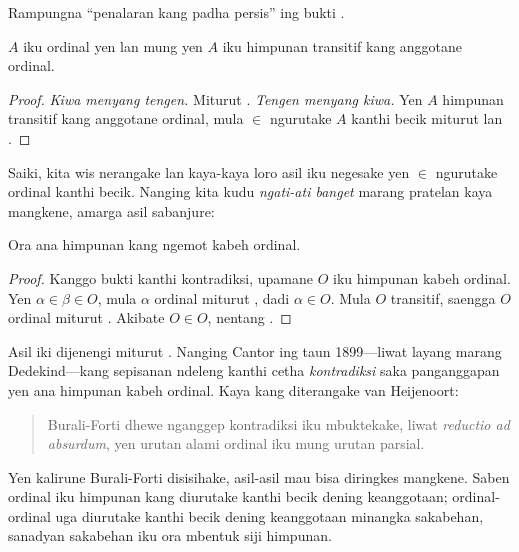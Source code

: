 \documentclass[../../../include/open-logic-section]{subfiles}
\begin{document}
\begin{prob}
Rampungna ``penalaran kang padha persis'' ing bukti
.
\end{prob}

\begin{cor}
$A$ iku ordinal yen lan mung yen $A$ iku himpunan
transitif kang anggotane ordinal.
\end{cor}

\begin{proof}
\emph{Kiwa menyang tengen.} Miturut
. \emph{Tengen menyang kiwa.}
Yen $A$ himpunan transitif kang anggotane ordinal,
mula $\in$ ngurutake $A$ kanthi becik miturut
 lan .
\end{proof}

Saiki, kita wis nerangake
 lan 
kaya-kaya loro asil iku negesake yen $\in$ ngurutake
ordinal kanthi becik. Nanging kita kudu
\emph{ngati-ati banget} marang pratelan kaya mangkene,
amarga asil sabanjure:

\begin{thm}
Ora ana himpunan kang ngemot kabeh ordinal.
\end{thm}

\begin{proof}
Kanggo bukti kanthi kontradiksi, upamane $O$ iku
himpunan kabeh ordinal. Yen $\alpha \in \beta \in O$,
mula $\alpha$ ordinal miturut ,
dadi $\alpha \in O$. Mula $O$ transitif, saengga
$O$ ordinal miturut .
Akibate $O \in O$, nentang .
\end{proof}
\noindent
Asil iki dijenengi miturut \citeauthor{Burali-Forti1897}.
Nanging Cantor ing taun 1899---liwat layang marang
Dedekind---kang sepisanan ndeleng kanthi cetha
\emph{kontradiksi} saka panganggapan yen ana himpunan
kabeh ordinal. Kaya kang diterangake van Heijenoort:
\begin{quote}
  Burali-Forti dhewe nganggep kontradiksi iku mbuktekake,
  liwat \emph{reductio ad absurdum}, yen urutan alami
  ordinal iku mung urutan parsial.
  \citep[p.~105]{Heijenoort1967}
\end{quote}
Yen kalirune Burali-Forti disisihake, asil-asil mau
bisa diringkes mangkene. Saben ordinal iku himpunan
kang diurutake kanthi becik dening keanggotaan;
ordinal-ordinal uga diurutake kanthi becik dening
keanggotaan minangka sakabehan, sanadyan sakabehan
iku ora mbentuk siji himpunan.
\end{document}
